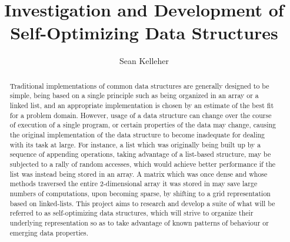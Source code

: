 \documentclass{report}
\title{Investigation and Development of Self-Optimizing Data Structures}
\author{Sean Kelleher}
\begin{document}
\maketitle

\begin{abstract}

Traditional implementations of common data structures are generally designed to
be simple, being based on a single principle such as being organized in an array
or a linked list, and an appropriate implementation is chosen by an estimate of
the best fit for a problem domain. However, usage of a data structure can change
over the course of execution of a single program, or certain properties of the
data may change, causing the original implementation of the data structure to
become inadequate for dealing with its task at large. For instance, a list which
was originally being built up by a sequence of appending operations, taking
advantage of a list-based structure, may be subjected to a rally of random
accesses, which would achieve better performance if the list was instead being
stored in an array. A matrix which was once dense and whose methods traversed
the entire 2-dimensional array it was stored in may save large numbers of
computations, upon becoming sparse, by shifting to a grid representation based
on linked-lists. This project aims to research and develop a suite of what will
be referred to as self-optimizing data structures, which will strive to organize
their underlying representation so as to take advantage of known patterns of
behaviour or emerging data properties.

\end{abstract}
\end{document}
